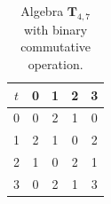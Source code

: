 \documentclass[11pt]{amsart}
\theoremstyle{definition}
\theoremstyle{remark}
\theoremstyle{plain}
\def\T{\mathbf{T}}
\begin{document}
\begin{table}[h!]
\centering
 \begin{tabular}{c|c c c c}

    $t$ & 0 & 1 & 2  & 3\\
\hline

    0 & 0 & 2 & 1 & 0  \\

	1 & 2 & 1 & 0 & 2 \\
	
	2 & 1 & 0 & 2 & 1\\
	
	3 & 0 & 2 & 1 & 3\\
	

\end{tabular}  
\caption{Algebra $\T_{4,7}$ with binary commutative operation.}
\label{table:6}
\end{table}
\end{document}
